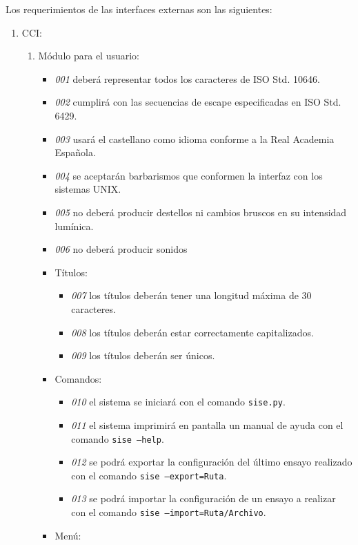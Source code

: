 Los requerimientos de las interfaces externas son las siguientes:

\begin{enumerate}
	\item CCI:
		\begin{enumerate}
			\item Módulo para el usuario:
				\begin{itemize}
					\item \emph{001} deberá representar todos los caracteres de ISO Std. 10646.
					\item \emph{002} cumplirá con las secuencias de escape especificadas en ISO Std. 6429.
					\item \emph{003} usará el castellano como idioma conforme a la Real Academia Española.
					\item \emph{004} se aceptarán barbarismos que conformen la interfaz con los sistemas UNIX.
					\item \emph{005} no deberá producir destellos ni cambios bruscos en su intensidad lumínica.
					\item \emph{006} no deberá producir sonidos
					\item Títulos:
						\begin{itemize}
							\item \emph{007} los títulos deberán tener una longitud máxima de 30 caracteres.
							\item \emph{008} los títulos deberán estar correctamente capitalizados.
							\item \emph{009} los títulos deberán ser únicos.
						\end{itemize}
					\item Comandos:
						\begin{itemize}
							\item \emph{010} el sistema se iniciará con el comando \texttt{sise.py}.
							\item \emph{011} el sistema imprimirá en pantalla un manual de ayuda con el comando \texttt{sise --help}.
							\item \emph{012} se podrá exportar la configuración del último ensayo realizado con el comando \texttt{sise --export=Ruta}.
							\item \emph{013} se podrá importar la configuración de un ensayo a realizar con el comando \texttt{sise --import=Ruta/Archivo}.
						\end{itemize}
					\item Menú:
						\begin{itemize}

\end{itemize}
\end{itemize}
\end{enumerate}
\end{enumerate}
